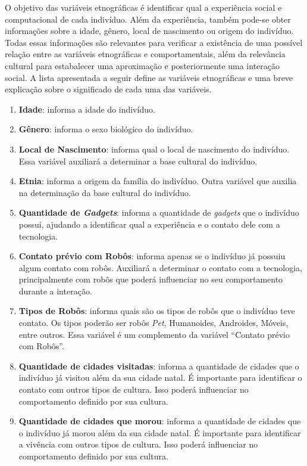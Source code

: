 O objetivo das variáveis etnográficas é identificar qual a experiência social e computacional de cada indivíduo. Além da experiência, também pode-se obter informações sobre a idade, gênero, local de nascimento ou origem do indivíduo. Todas essas informações são relevantes para verificar a existência de uma possível relação entre as variáveis etnográficas e comportamentais, além da relevância cultural para estabalecer uma aproximação e posteriormente uma interação social. A lista apresentada a seguir define as variáveis etnográficas e uma breve explicação sobre o significado de cada uma das variáveis.

\begin{enumerate}
	\item \textbf{Idade}: informa a idade do indivíduo.
	\item \textbf{Gênero}: informa o sexo biológico do indivíduo.
	\item \textbf{Local de Nascimento}: informa qual o local de nascimento do indivíduo. Essa variável auxiliará a determinar a base cultural do indivíduo.
	\item \textbf{Etnia}: informa a origem da família do indivíduo. Outra variável que auxilia na determinação da base cultural do indivíduo.
	\item \textbf{Quantidade de \emph{Gadgets}}: informa a quantidade de \emph{gadgets} que o indivíduo possui, ajudando a identificar qual a experiência e o contato dele com a tecnologia.
	\item \textbf{Contato prévio com Robôs}: informa apenas se o indivíduo já possuiu algum contato com robôs. Auxiliará a determinar o contato com a tecnologia, principalmente com robôs que poderá influenciar no seu comportamento durante a interação.
	\item \textbf{Tipos de Robôs}: informa quais são os tipos de robôs que o indivíduo teve contato. Os tipos poderão ser robôs \emph{Pet}, Humanoides, Androides, Móveis, entre outros. Essa variável é um complemento da variável ``Contato prévio com Robôs''.
	\item \textbf{Quantidade de cidades visitadas}: informa a quantidade de cidades que o indivíduo já visitou além da sua cidade natal. É importante para identificar o contato com outros tipos de cultura. Isso poderá influenciar no comportamento definido por sua cultura.
	\item \textbf{Quantidade de cidades que morou}: informa a quantidade de cidades que o indivíduo já morou além da sua cidade natal. É importante para identificar a vivência com outros tipos de cultura. Isso poderá influenciar no comportamento definido por sua cultura.

\end{enumerate}
